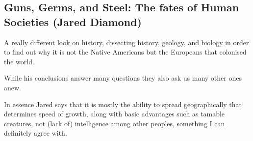 \subsection{Guns, Germs, and Steel: The fates of Human Societies (Jared Diamond)}

A really different look on history, dissecting history, geology, and biology in order to find out why it is not the Native Americans but the Europeans that colonised the world.

While his conclusions answer many questions they also ask us many other ones anew.

In essence Jared says that it is mostly the ability to spread geographically that determines speed of growth, along with basic advantages such as tamable creatures, not (lack of) intelligence among other peoples, something I can definitely agree with.